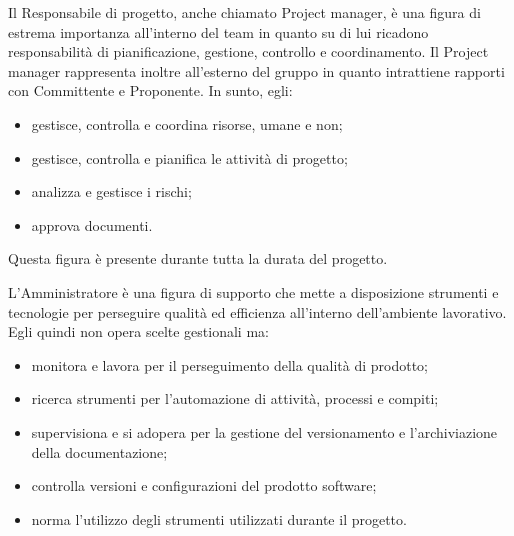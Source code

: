 
                Il Responsabile di progetto, anche chiamato Project manager, è una figura di estrema importanza all'interno
                del team in quanto su di lui ricadono responsabilità di pianificazione, gestione, controllo e coordinamento.
                Il Project manager rappresenta inoltre \GroupName{} all'esterno del gruppo in quanto intrattiene rapporti
                con Committente e Proponente. In sunto, egli:

                    \begin{itemize}
                        \item gestisce, controlla e coordina risorse, umane e non;
                        \item gestisce, controlla e pianifica le attività di progetto;
                        \item analizza e gestisce i rischi;
                        \item approva documenti.
                    \end{itemize}

                Questa figura è presente durante tutta la durata del progetto.


                L'Amministratore è una figura di supporto che mette a disposizione strumenti e tecnologie per perseguire
                qualità ed efficienza all'interno dell'ambiente lavorativo.
                Egli quindi non opera scelte gestionali ma:

                    \begin{itemize}
                        \item monitora e lavora per il perseguimento della qualità di prodotto;
                        \item ricerca strumenti per l'automazione di attività, processi e compiti;
                        \item supervisiona e si adopera per la gestione del versionamento e l'archiviazione della documentazione;
                        \item controlla versioni e configurazioni del prodotto software;
                        \item norma l'utilizzo degli strumenti utilizzati durante il progetto.
                    \end{itemize}



